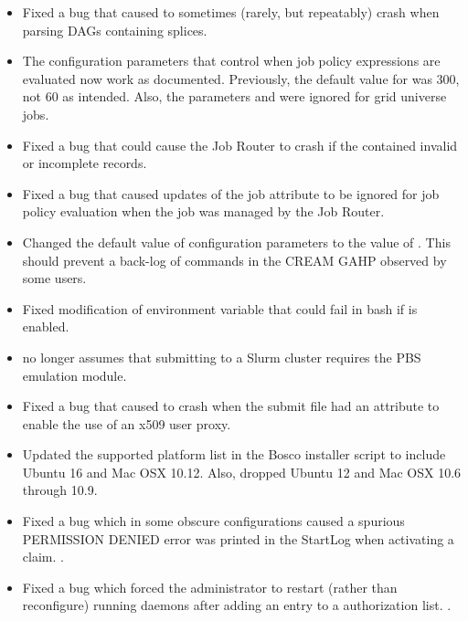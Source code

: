 \begin{itemize}
\item Fixed a bug that caused  to sometimes (rarely, but
repeatably) crash when parsing DAGs containing splices.

\item The configuration parameters that control when job policy expressions
are evaluated now work as documented.
Previously, the default value for  was
300, not 60 as intended.
Also, the parameters  and
 were ignored for grid universe jobs.

\item Fixed a bug that could cause the Job Router to crash if the
 contained invalid or incomplete records.

\item Fixed a bug that caused updates of the job attribute
 to be ignored for job policy evaluation
when the job was managed by the Job Router.

\item Changed the default value of configuration parameters
 to the value of
.
This should prevent a back-log of commands in the CREAM GAHP observed
by some users.

\item Fixed modification of  environment variable that
could fail in bash if  is enabled.

\item {} no longer assumes that submitting to a Slurm
cluster requires the PBS emulation module.

\item Fixed a bug that caused   to crash when
the submit file had an attribute to enable the use of an x509 user proxy.

\item Updated the supported platform list in the Bosco installer script to
include Ubuntu 16 and Mac OSX 10.12. Also, dropped Ubuntu 12 and Mac OSX
10.6 through 10.9.

\item Fixed a bug which in some obscure configurations caused a spurious
PERMISSION DENIED error was printed in the StartLog when activating a claim.
.

\item Fixed a bug which forced the administrator to restart (rather than
reconfigure) running daemons after adding an entry to a 
authorization list.
.

\end{itemize}

